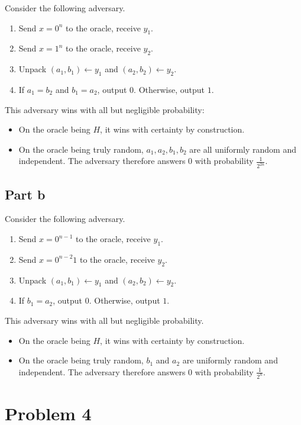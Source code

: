 \documentclass{article}
\theoremstyle{definition}
\begin{document}
Consider the following adversary.
\begin{enumerate}
    \item Send $x=0^n$ to the oracle, receive $y_1$.
    \item Send $x=1^n$ to the oracle, receive $y_2$.
    \item Unpack $(a_1, b_1)\gets y_1$ and $(a_2, b_2)\gets y_2$.
    \item If $a_1=b_2$ and $b_1=a_2$, output $0$. Otherwise, output $1$.
\end{enumerate}
This adversary wins with all but negligible probability:
\begin{itemize}
    \item On the oracle being $H$, it wins with certainty by construction.
    \item On the oracle being truly random, $a_1, a_2, b_1, b_2$ are all uniformly random and independent.
    The adversary therefore answers $0$ with probability $\frac{1}{2^{2n}}$.
\end{itemize}

\subsection*{Part b}

Consider the following adversary.
\begin{enumerate}
    \item Send $x=0^{n-1}$ to the oracle, receive $y_1$.
    \item Send $x=0^{n-2}1$ to the oracle, receive $y_2$.
    \item Unpack $(a_1, b_1)\gets y_1$ and $(a_2, b_2)\gets y_2$.
    \item If $b_1=a_2$, output $0$. Otherwise, output $1$.
\end{enumerate}
This adversary wins with all but negligible probability.
\begin{itemize}
    \item On the oracle being $H$, it wins with certainty by construction.
    \item On the oracle being truly random, $b_1$ and $a_2$ are uniformly random and independent.
    The adversary therefore answers $0$ with probability $\frac{1}{2^{n}}$.
\end{itemize}

\section*{Problem 4}
\end{document}
